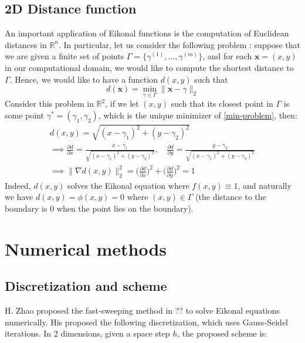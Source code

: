 \documentclass[11pt]{article}
\theoremstyle{definition}
\theoremstyle{remark}
\newcommand{\R}{\mathbb{R}}
\begin{document}
\subsection{2D Distance function}
An important application of Eikonal functions is the computation of Euclidean distances in $\R^n$. In particular, let us consider the following problem : suppose that we are given a  finite set of points $\Gamma = \{\gamma^{(1)},\dots,\gamma^{(m)}\}$, and for each $\textbf{x}=(x,y)$ in our computational domain, we would like to compute the shortest distance to $\Gamma$. Hence, we would like to have a function $d(x,y)$ such that
\begin{equation}
\label{min-problem}
    d(\textbf{x}) = \min_{\gamma \in \Gamma}\|\textbf{x}-\gamma\|_2
\end{equation}
Consider this problem in $\R^2$, if we let $(x,y)$ such that its closest point in $\Gamma$ is some point $\gamma^{*}=(\gamma_1,\gamma_2)$, which is the unique minimizer of \eqref{min-problem}, then:
\begin{gather*}
    d(x,y) = \sqrt{(x-\gamma_1)^2+(y-\gamma_2)^2} \\[10pt] 
    \implies\frac{\partial d}{\partial x}=\frac{x-\gamma_1}{\sqrt{(x-\gamma_1)^2+(y-\gamma_2)^2}}, \quad 
    \frac{\partial d}{\partial y}=\frac{y-\gamma_2}{\sqrt{(x-\gamma_1)^2+(y-\gamma_2)^2}} \\[10pt] 
    \implies \|\nabla d(x,y)\|^{2}_{2} = \Bigg(\frac{\partial d}{\partial x}\Bigg)^2 + \Bigg(\frac{\partial d}{\partial y}\Bigg)^2=1
\end{gather*}
Indeed, $d(x,y)$ solves the Eikonal equation where $f(x,y) \equiv 1$, and naturally we have $d(x,y)=\phi(x,y)=0$ where $(x,y)\in\Gamma$ (the distance to the boundary is 0 when the point lies on the boundary).
\section{Numerical methods}
\subsection{Discretization and scheme}
H. Zhao proposed the fast-sweeping method in ?? to solve Eikonal equations numerically. His proposed the following discretization, which uses Gauss-Seidel iterations. In 2 dimensions, given a space step $h$, the proposed scheme is:
\end{document}

